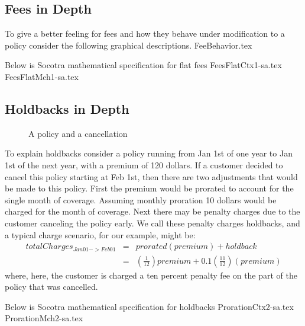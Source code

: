 \subsection{Fees in Depth}
To give a better feeling for fees and how they behave under modification to a policy consider the following
graphical descriptions.
{FeeBehavior.tex}

Below is Socotra mathematical specification for flat fees
{FeesFlatCtx1-sa.tex}
{FeesFlatMch1-sa.tex}

\subsection{Holdbacks in Depth}

\begin{figure}[ht]
  \caption{
    A policy and a cancellation
  }
  \label{fig:3:2}
\end{figure}

To explain holdbacks consider a policy running from Jan 1st of one year to Jan 1st of the next year, with a
premium of 120 dollars. If
a customer decided to cancel this policy starting at Feb 1st, then there are two adjustments that would
be made to this policy. First the premium would be prorated to account for the single month of coverage.
Assuming monthly proration 10 dollars would be charged for the month of coverage. Next there may be penalty
charges due to the customer canceling the policy early. We call these penalty charges holdbacks, and a typical
charge scenario, for our example, might be:
\begin{eqnarray*}
totalCharges_{Jan01->Feb01} & = & prorated(premium) + holdback \\
                          & = & (\frac{1}{12}) premium + 0.1(\frac{11}{12})(premium)
\end{eqnarray*}
where, here, the customer is charged a ten percent penalty fee on the part of the policy that was cancelled.


Below is Socotra mathematical specification for holdbacks
{ProrationCtx2-sa.tex}
{ProrationMch2-sa.tex}

